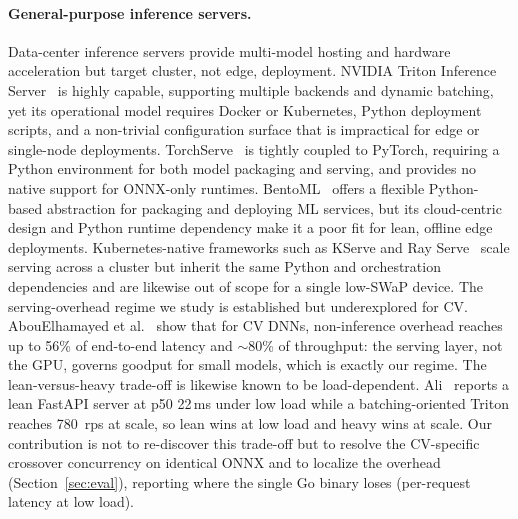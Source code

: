 \paragraph{General-purpose inference servers.}
Data-center inference servers provide multi-model hosting and hardware
acceleration but target cluster, not edge, deployment.
NVIDIA Triton Inference Server~\cite{nvidia2023triton} is highly capable,
supporting multiple backends and dynamic batching, yet its operational model
requires Docker or Kubernetes, Python deployment scripts, and a non-trivial
configuration surface that is impractical for edge or single-node
deployments.
TorchServe~\cite{pytorch2023torchserve} is tightly coupled to PyTorch,
requiring a Python environment for both model packaging and serving, and
provides no native support for ONNX-only runtimes.
BentoML~\cite{bentoml2023} offers a flexible Python-based abstraction for
packaging and deploying ML services, but its cloud-centric design and Python
runtime dependency make it a poor fit for lean, offline edge deployments.
Kubernetes-native frameworks such as KServe and Ray Serve~\cite{kserve,rayserve}
scale serving across a cluster but inherit the same Python and orchestration
dependencies and are likewise out of scope for a single low-SWaP device.
The serving-overhead regime we study is established but underexplored for CV.
AbouElhamayed et al.~\cite{abouelhamayed2024beyond} show that for CV DNNs,
non-inference overhead reaches up to 56\% of end-to-end latency and $\sim$80\% of
throughput: the serving layer, not the GPU, governs goodput for small
models, which is exactly our regime. The lean-versus-heavy trade-off is likewise
known to be load-dependent. Ali~\cite{ali2026fastapitriton} reports a lean FastAPI
server at p50 22\,ms under low load while a batching-oriented Triton reaches
780~rps at scale, so lean wins at low load and heavy wins at scale. Our contribution is
not to re-discover this trade-off but to resolve the CV-specific crossover
concurrency on identical ONNX and to localize the overhead
(Section~\ref{sec:eval}), reporting where the single Go binary loses
(per-request latency at low load).


